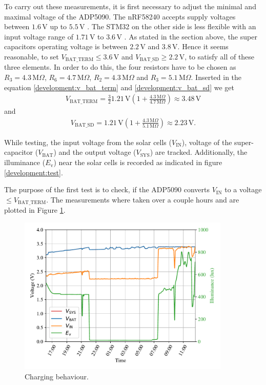 To carry out these measurements, it is first necessary to adjust the minimal and maximal voltage of the ADP5090.
The nRF58240 accepts supply voltages between $1.6\,\text{V}$ up to $5.5\,\text{V}$ \cite{nrf}.
The STM32 on the other side is less flexible with an input voltage range of $1.71\,\text{V}$ to $3.6\,\text{V}$ \cite{stm32}.
As stated in the section above, the super capacitors operating voltage is between $2.2\,\text{V}$ and $3.8\,\text{V}$.
Hence it seems reasonable, to set $V_{\text{BAT\_TERM}} \le 3.6\,\text{V}$ and $V_{\text{BAT\_SD}} \ge 2.2\,\text{V}$, to satisfy all of these three elements.
In order to do this, the four resistors have to be chosen as $R_3 = 4.3\,\text{M}\Omega$, $R_6 = 4.7\,\text{M}\Omega$, $R_2 = 4.3\,\text{M}\Omega$ and $R_3 = 5.1\,\text{M}\Omega$.
Inserted in the equation \eqref{development:v_bat_term} and \eqref{development:v_bat_sd} we get
\begin{align}
	V_{\text{BAT\_TERM}}= \frac{3}{2} 1.21\,\text{V} \left(1 + \frac{4.3\,\text{M}\Omega}{4.7 \,\text{M}\Omega} \right) \approx 3.48\,\text{V} 
\end{align}
and
\begin{align}
	V_{\text{BAT\_SD}} = 1.21\,\text{V} \left(1 + \frac{4.3\,\text{M}\Omega}{5.1\,\text{M}\Omega} \right) \approx 2.23\,\text{V}. 
\end{align}

While testing, the input voltage from the solar cells ($V_{\text{IN}}$), voltage of the super-capacitor ($V_{\text{BAT}}$) and the output voltage ($V_{\text{SYS}}$) are tracked. Additionally, the illuminance ($E_\text{v}$) near the solar cells  is recorded as indicated in figure \ref{development:test}.

The purpose of the first test is to check, if the ADP5090 converts $V_{\text{IN}}$ to a voltage $\le V_{\text{BAT\_TERM}}$.
The measurements where taken over a couple hours and are plotted in Figure \ref{development:charge}.

\begin{figure}[ht]
	\centering
	\includegraphics[width=0.9\textwidth]{4-development/hardware/graphics/laden.pdf}
	\caption{Charging behaviour.\label{development:charge}}
\end{figure}


